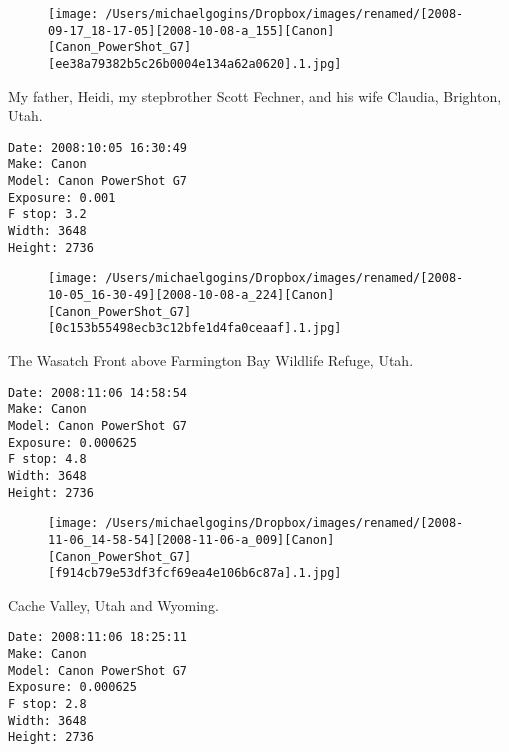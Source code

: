 \documentclass[11pt,letter,DIV=14,paper=landscape]{scrbook}
\begin{document}
\begin{figure}
\texttt{[image: /Users/michaelgogins/Dropbox/images/renamed/[2008-09-17\_18-17-05][2008-10-08-a\_155][Canon][Canon\_PowerShot\_G7][ee38a79382b5c26b0004e134a62a0620].1.jpg]}
\end{figure}
    
\clearpage
\noindent My father, Heidi, my stepbrother Scott Fechner, and his wife Claudia, Brighton, Utah.
\noindent
\begin{lstlisting}
Date: 2008:10:05 16:30:49
Make: Canon
Model: Canon PowerShot G7
Exposure: 0.001
F stop: 3.2
Width: 3648
Height: 2736
\end{lstlisting}
\clearpage

\begin{figure}
\texttt{[image: /Users/michaelgogins/Dropbox/images/renamed/[2008-10-05\_16-30-49][2008-10-08-a\_224][Canon][Canon\_PowerShot\_G7][0c153b55498ecb3c12bfe1d4fa0ceaaf].1.jpg]}
\end{figure}
    
\clearpage
\noindent The Wasatch Front above Farmington Bay Wildlife Refuge, Utah.
\noindent
\begin{lstlisting}
Date: 2008:11:06 14:58:54
Make: Canon
Model: Canon PowerShot G7
Exposure: 0.000625
F stop: 4.8
Width: 3648
Height: 2736
\end{lstlisting}
\clearpage

\begin{figure}
\texttt{[image: /Users/michaelgogins/Dropbox/images/renamed/[2008-11-06\_14-58-54][2008-11-06-a\_009][Canon][Canon\_PowerShot\_G7][f914cb79e53df3fcf69ea4e106b6c87a].1.jpg]}
\end{figure}
    
\clearpage
\noindent Cache Valley, Utah and Wyoming.
\noindent
\begin{lstlisting}
Date: 2008:11:06 18:25:11
Make: Canon
Model: Canon PowerShot G7
Exposure: 0.000625
F stop: 2.8
Width: 3648
Height: 2736
\end{lstlisting}
\clearpage
\end{document}
